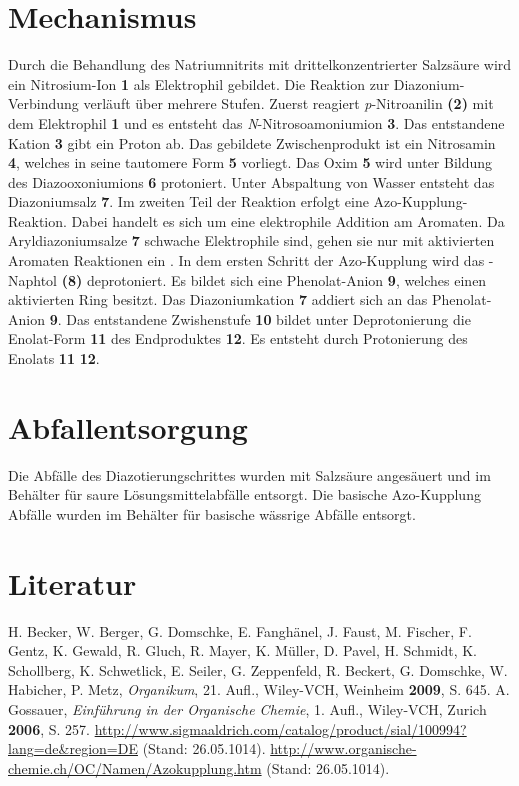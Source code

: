 \documentclass[12pt]{article}
\begin{document}
\begin{onehalfspace}
\section{Mechanismus\cite{bio}}
Durch die Behandlung des Natriumnitrits mit drittelkonzentrierter Salzsäure wird ein Nitrosium-Ion \textbf{1} als Elektrophil gebildet. Die Reaktion zur Diazonium-Verbindung verläuft über mehrere Stufen. Zuerst reagiert \textit{p}-Nitroanilin \textbf{(2)} mit dem Elektrophil \textbf{1} und es entsteht das \textit{N}-Nitrosoamoniumion \textbf{3}. Das entstandene Kation \textbf{3} gibt ein Proton ab. Das gebildete Zwischenprodukt ist ein Nitrosamin \textbf{4}, welches in seine tautomere Form \textbf{5} vorliegt. Das Oxim \textbf{5} wird unter Bildung des Diazooxoniumions \textbf{6} protoniert. Unter Abspaltung von Wasser entsteht das Diazoniumsalz \textbf{7}.
Im zweiten Teil der Reaktion erfolgt eine Azo-Kupplung-Reaktion. Dabei handelt es sich um eine elektrophile Addition am Aromaten. Da Aryldiazoniumsalze \textbf{7} schwache Elektrophile sind, gehen sie nur mit aktivierten Aromaten Reaktionen ein \cite{reak}. In dem ersten Schritt der Azo-Kupplung wird das \chembeta-Naphtol \textbf{(8)} deprotoniert. Es bildet sich eine Phenolat-Anion \textbf{9}, welches einen aktivierten Ring besitzt. Das Diazoniumkation \textbf{7} addiert sich an das Phenolat-Anion \textbf{9}. Das entstandene Zwishenstufe \textbf{10} bildet unter Deprotonierung die Enolat-Form \textbf{11} des Endproduktes \textbf{12}. Es entsteht durch Protonierung des Enolats \textbf{11}  \textbf{12}.
\section{Abfallentsorgung}
Die Abfälle des Diazotierungschrittes wurden mit Salzsäure angesäuert und im Behälter für saure Lösungsmittelabfälle entsorgt. Die basische Azo-Kupplung Abfälle wurden im Behälter für basische wässrige Abfälle entsorgt.
\section{Literatur}
\renewcommand{\section}[2]{}%
\begin{thebibliography}{}
H. Becker, W. Berger, G. Domschke, E. Fanghänel, J. Faust, M. Fischer, F. Gentz, K. Gewald, R. Gluch, R. Mayer, K. Müller, D. Pavel, H. Schmidt, K. Schollberg, K. Schwetlick, E. Seiler, G. Zeppenfeld, R. Beckert, G. Domschke, W. Habicher, P. Metz, \textit{Organikum}, 21. Aufl., Wiley-VCH, Weinheim \textbf{2009}, S. 645.
A. Gossauer, \textit{Einführung in der Organische Chemie}, 1. Aufl., Wiley-VCH, Zurich \textbf{2006}, S. 257.
\url{http://www.sigmaaldrich.com/catalog/product/sial/100994?lang=de&region=DE} (Stand: 26.05.1014).
\url{http://www.organische-chemie.ch/OC/Namen/Azokupplung.htm} (Stand: 26.05.1014).
\end{thebibliography}
\end{onehalfspace}
\end{document}
